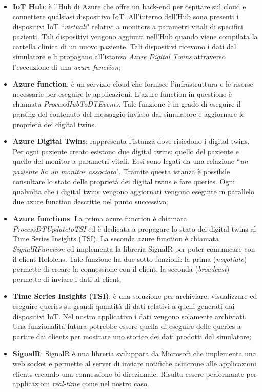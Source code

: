 \begin{itemize}

    \item \textbf{IoT Hub}: è l'Hub di Azure che offre un back-end per ospitare sul cloud e connettere qualsiasi dispositivo IoT. All'interno dell'Hub sono presenti i dispositivi IoT ``\textit{virtuali}" relativi a monitors a parametri vitali di specifici pazienti. Tali dispositivi vengono aggiunti nell'Hub quando viene compilata la cartella clinica di un nuovo paziente. Tali dispositivi ricevono i dati dal simulatore e li propagano all'istanza \textit{Azure Digital Twins} attraverso l'esecuzione di una \textit{azure function};
    
    \item \textbf{Azure function}: è un servizio cloud che fornisce l'infrastruttura e le risorse necessarie per eseguire le applicazioni. L'azure function in questione è chiamata \textit{ProcessHubToDTEvents}. Tale funzione è in grado di eseguire il parsing del contenuto del messaggio inviato dal simulatore e aggiornare le proprietà dei digital twins.
    
    \item \textbf{Azure Digital Twins}: rappresenta l'istanza dove risiedono i digital twins. Per ogni paziente creato esistono due digital twins: quello del paziente e quello del monitor a parametri vitali. Essi sono legati da una relazione ``\textit{un paziente ha un monitor associato}". Tramite questa istanza è possibile consultare lo stato delle proprietà dei digital twins e fare queries. Ogni qualvolta che i digital twins vengono aggiornati vengono eseguite in parallelo due azure function descritte nel punto successivo;
    
    \item \textbf{Azure functions}. La prima azure function è chiamata \textit{ProcessDTUpdatetoTSI} ed è dedicata a propagare lo stato dei digital twins al Time Series Insights (TSI). La seconda azure function è chiamata \textit{SignalRFunction} ed implementa la libreria SignalR per poter comunicare con il client Hololens. Tale funzione ha due sotto-funzioni: la prima (\textit{negotiate}) permette di creare la connessione con il client, la seconda (\textit{broadcast}) permette di inviare i dati al client;
    
    \item \textbf{Time Series Insights (TSI)}: è una soluzione per archiviare, visualizzare ed eseguire queries su grandi quantità di dati relativi a quelli generati dai dispositivi IoT. Nel nostro applicativo i dati vengono solamente archiviati. Una funzionalità futura potrebbe essere quella di eseguire delle queries a partire dai clients per mostrare uno storico dei dati prodotti dal simulatore;
    
    \item \textbf{SignalR}: SignalR è una libreria sviluppata da Microsoft che implementa una web socket e permette al server di inviare notifiche asincrone alle applicazioni clients creando una connessione bi-direzionale. Risulta essere performante per applicazioni \textit{real-time} come nel nostro caso.
\end{itemize}

